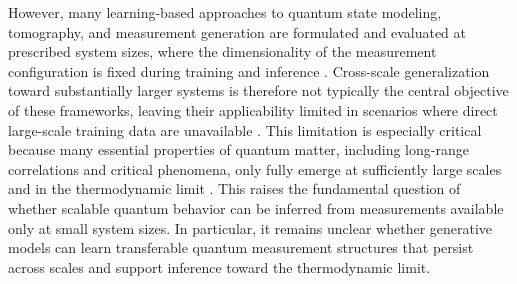 \documentclass[pdflatex,sn-mathphys-num]{sn-jnl}%
\theoremstyle{thmstyleone}%
\theoremstyle{thmstyletwo}%
\theoremstyle{thmstylethree}%
\begin{document}
However, many learning-based approaches to quantum state modeling, tomography, and measurement generation are formulated and evaluated at prescribed system sizes, where the dimensionality of the measurement configuration is fixed during training and inference \cite{chinzei2025learning, torlai2018neural}. Cross-scale generalization toward substantially larger systems is therefore not typically the central objective of these frameworks, leaving their applicability limited in scenarios where direct large-scale training data are unavailable \cite{cho2024machine}. This limitation is especially critical because many essential properties of quantum matter, including long-range correlations and critical phenomena, only fully emerge at sufficiently large scales and in the thermodynamic limit \cite{fisher1972scaling}. This raises the fundamental question of whether scalable quantum behavior can be inferred from measurements available only at small system sizes. In particular, it remains unclear whether generative models can learn transferable quantum measurement structures that persist across scales and support inference toward the thermodynamic limit.
\end{document}

